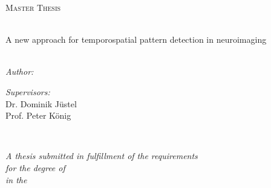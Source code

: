 \documentclass[
11pt, %
oneside, %
english, %
singlespacing, %
parskip, %
headsepline, %
]{MastersDoctoralThesis} %
\author{Michael \textsc{Gerstenberger}} %
\begin{document}
\frontmatter %

\pagestyle{plain} %


\begin{titlepage}
\begin{center}

\vspace*{.06\textheight}
{\scshape\LARGE \univname\par}\vspace{1.5cm} %
\textsc{\Large Master Thesis}\\[0.5cm] %

\HRule \\[0.4cm] %
{\fontsize{16}{18}\selectfont \bfseries \ttitle\par}\vspace{0.4cm}%
{\fontsize{11}{10}\selectfont  A new approach for temporospatial pattern detection in neuroimaging}%
\\
\HRule \\[1.5cm] %

\begin{minipage}[t]{0.4\textwidth}
\begin{flushleft} \large
\emph{Author:}\\
{\authorname} %
\end{flushleft}
\end{minipage}
\begin{minipage}[t]{0.4\textwidth}
\begin{flushright} \large
\emph{Supervisors:} \\
Dr. Dominik Jüstel
\\Prof. Peter König
\end{flushright}
\end{minipage}\\[2cm]

\vfill

\large \textit{A thesis submitted in fulfillment of the requirements\\ for the degree of \degreename}\\[0.3cm] %
\textit{in the}\\[0.4cm]
\groupname\\\deptname\\[2cm] %


\end{center}
\end{titlepage}
\end{document}
